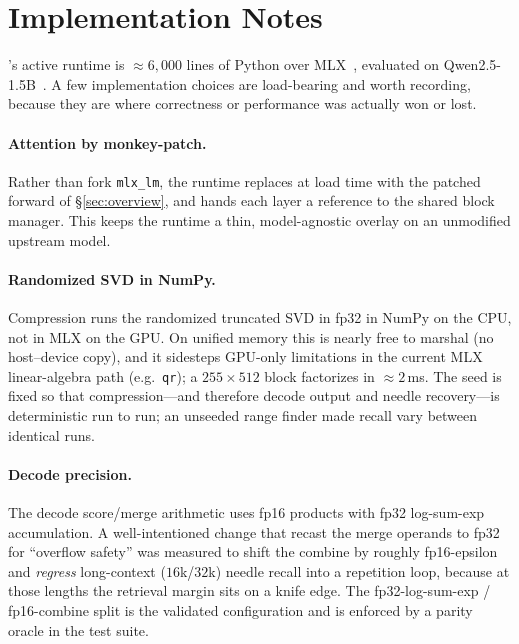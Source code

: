 \section{Implementation Notes}
\label{sec:impl}

\dkv{}'s active runtime is $\approx6{,}000$ lines of Python over MLX~\cite{mlx2023}, evaluated on
Qwen2.5-1.5B~\cite{qwen25}. A few implementation choices are load-bearing and worth recording,
because they are where correctness or performance was actually won or lost.

\begin{sloppypar}
\paragraph{Attention by monkey-patch.} Rather than fork \texttt{mlx\_lm}, the runtime
replaces  at load time with the patched forward of
\S\ref{sec:overview}, and hands each layer a reference to the shared block manager.
This keeps the runtime a thin, model-agnostic overlay on an unmodified upstream model.

\paragraph{Randomized SVD in NumPy.} Compression runs the randomized truncated SVD
in fp32 in NumPy on the CPU, not in MLX on the GPU. On unified memory this is nearly
free to marshal (no host--device copy), and it sidesteps GPU-only limitations in the
current MLX linear-algebra path (e.g.\ \texttt{qr}); a $255\times512$ block factorizes
in $\approx2$\,ms. The seed is fixed so that compression---and therefore decode output
and needle recovery---is deterministic run to run; an unseeded range finder made recall
vary between identical runs.
\end{sloppypar}

\paragraph{Decode precision.} The decode score/merge arithmetic uses fp16 products with fp32
log-sum-exp accumulation. A well-intentioned change that recast the merge operands to fp32 for
``overflow safety'' was measured to shift the combine by roughly fp16-epsilon and \emph{regress}
long-context ($16$k/$32$k) needle recall into a repetition loop, because at those lengths the
retrieval margin sits on a knife edge. The fp32-log-sum-exp / fp16-combine split is the validated
configuration and is enforced by a parity oracle in the test suite.


